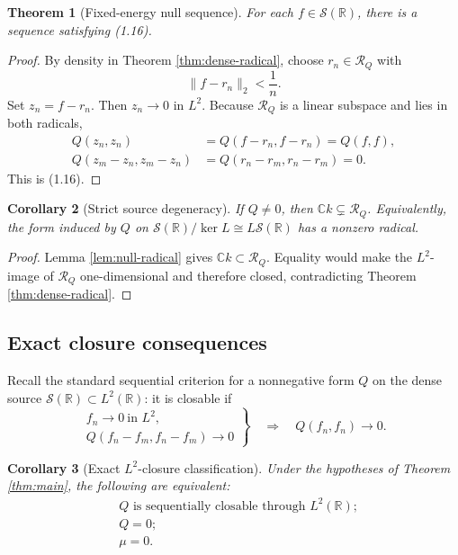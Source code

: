 \documentclass[11pt]{article}
\newtheorem{theorem}{Theorem}[section]
\newtheorem{corollary}[theorem]{Corollary}
\newcommand{\C}{\mathbb C}
\newcommand{\R}{\mathbb R}
\newcommand{\cS}{\mathcal S}
\newcommand{\cR}{\mathcal R}
\begin{document}
\begin{theorem}[Fixed-energy null sequence]\label{thm:null-sequence}
For each \(f\in\cS(\R)\), there is a sequence satisfying (1.16).
\end{theorem}

\begin{proof}
By density in Theorem \ref{thm:dense-radical}, choose \(r_n\in\cR_Q\) with
\[
 \|f-r_n\|_2<\frac1n.
\tag{5.5}
\]
Set \(z_n=f-r_n\).  Then \(z_n\to0\) in \(L^2\).  Because \(\cR_Q\) is a linear subspace and
lies in both radicals,
\[
\begin{aligned}
 Q(z_n,z_n)&=Q(f-r_n,f-r_n)=Q(f,f),\\
 Q(z_m-z_n,z_m-z_n)&=Q(r_n-r_m,r_n-r_m)=0.
\end{aligned}
\]
This is (1.16).
\end{proof}

\begin{corollary}[Strict source degeneracy]\label{cor:strict-degeneracy}
If \(Q\neq0\), then \(\C k\subsetneq\cR_Q\).  Equivalently, the form induced by \(Q\) on
\(\cS(\R)/\ker L\cong L\cS(\R)\) has a nonzero radical.
\end{corollary}

\begin{proof}
Lemma \ref{lem:null-radical} gives \(\C k\subset\cR_Q\).  Equality would make the \(L^2\)-image
of \(\cR_Q\) one-dimensional and therefore closed, contradicting Theorem
\ref{thm:dense-radical}.
\end{proof}

\subsection{Exact closure consequences}

Recall the standard sequential criterion for a nonnegative form \(Q\) on the dense source
\(\cS(\R)\subset L^2(\R)\): it is closable if
\[
\left.
\begin{array}{c}
 f_n\to0\ \text{in }L^2,\\
 Q(f_n-f_m,f_n-f_m)\to0
\end{array}
\right\}
\quad\Longrightarrow\quad
 Q(f_n,f_n)\to0.
\tag{5.6}
\]

\begin{corollary}[Exact \(L^2\)-closure classification]\label{cor:closure}
Under the hypotheses of Theorem \ref{thm:main}, the following are equivalent:
\[
\begin{split}
 &Q\text{ is sequentially closable through }L^2(\R);\\
 &Q=0;\\
 &\mu=0.
\end{split}
\tag{5.7}
\]
\end{corollary}
\end{document}
